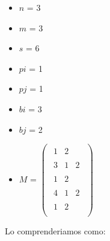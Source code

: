 \medskip
\begin{multicols}{3}
  \begin{itemize}[]
      \item $n$ = 3
      \item $m$ = 3
      \item $s$ = 6
    \end{itemize}
\columnbreak
  \begin{itemize}[]
      \item $pi$ = 1
      \item $pj$ = 1
      \item $bi$ = 3
      \item $bj$ = 2
    \end{itemize}
\columnbreak
  \begin{itemize}[]
      \item $M$ =
        $
        \begin{pmatrix}
        \begin{matrix} 1 & 2 \end{matrix}\\
        \begin{matrix}3 & 1 & 2 \end{matrix}\\
        \begin{matrix} 1 & 2 \end{matrix}\\
        \begin{matrix}4 & 1 & 2 \end{matrix}\\
        \begin{matrix} 1 & 2 \end{matrix}\\
        \end{pmatrix}
        $
    \end{itemize}
\end{multicols}
\medskip

Lo comprenderiamos como:

\medskip


\begin{centering}

\newarray\data
{}%


\end{centering}


